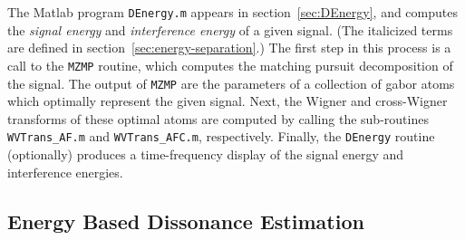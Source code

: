 The Matlab program {\tt DEnergy.m} appears in
section~\ref{sec:DEnergy}, and computes the \emph{signal energy}
and \emph{interference energy} of a given signal.  (The italicized
terms are defined in section~\ref{sec:energy-separation}.)  The first
step in this process is a call to the {\tt MZMP} routine, which
computes the matching pursuit decomposition of the signal. The output
of {\tt MZMP} are the parameters of a collection of gabor atoms
which optimally represent the given signal. Next, the Wigner and
cross-Wigner transforms of these optimal atoms are computed by calling
the sub-routines {\tt WVTrans\_AF.m} and {\tt WVTrans\_AFC.m},
respectively.  Finally, the {\tt DEnergy} routine (optionally)
produces a time-frequency display of the signal energy and
interference energies.

\subsection{Energy Based Dissonance Estimation}
\label{sec:EnergyDissonance}
